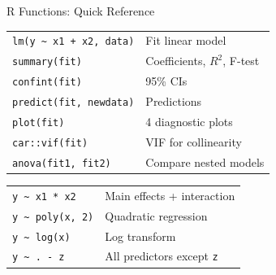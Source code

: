 \documentclass[aspectratio=169, 11pt]{beamer}
\begin{document}
\begin{frame}{R Functions: Quick Reference}

\begin{center}
\begin{tabular}{ll}
\toprule
\texttt{lm(y \textasciitilde{} x1 + x2, data)} & Fit linear model \\
\texttt{summary(fit)} & Coefficients, $R^2$, F-test \\
\texttt{confint(fit)} & 95\% CIs \\
\texttt{predict(fit, newdata)} & Predictions \\
\texttt{plot(fit)} & 4 diagnostic plots \\
\texttt{car::vif(fit)} & VIF for collinearity \\
\texttt{anova(fit1, fit2)} & Compare nested models \\
\bottomrule
\end{tabular}
\end{center}

\vspace{0.3em}
\begin{center}
\begin{tabular}{ll}
\toprule
\texttt{y \textasciitilde{} x1 * x2} & Main effects + interaction \\
\texttt{y \textasciitilde{} poly(x, 2)} & Quadratic regression \\
\texttt{y \textasciitilde{} log(x)} & Log transform \\
\texttt{y \textasciitilde{} . - z} & All predictors except \texttt{z} \\
\bottomrule
\end{tabular}
\end{center}
\end{frame}
\end{document}
